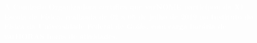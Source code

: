 \documentclass[fontsize=14pt]{scrartcl}
\begin{document}
\thispagestyle{empty}
\vspace*{7.5cm}
\hspace{7cm}
\begin{minipage}[t][7cm][t]{19cm}
\normalfont \bfseries
\textcolor{white}{A Comissão Organizadora certifica que varNOME participou da \mbox{XI} \mbox{Escola} de \mbox{Física}, realizada de 02 a 05 de julho de 2019 no Instituto do Física da Universidade Federal de Goiás, com carga horária de varHORAS horas de atividades.}
\end{minipage}
\end{document}
